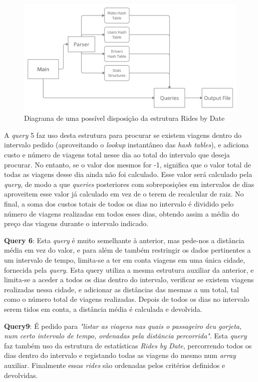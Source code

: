 \documentclass[12pt,a4paper]{report}
\begin{document}
    \begin{figure}[h]
    \includegraphics[scale = 0.45]{diagram2.png}
    \centering
    \caption{Diagrama de uma possível disposição da estrutura Rides by Date}
    \end{figure} 

    \par A \textit{query} 5 faz uso desta estrutura para procurar se existem viagens dentro do intervalo pedido (aproveitando o \textit{lookup} instantâneo das \textit{hash tables}), e adiciona custo e número de viagens total nesse dia ao total do intervalo que deseja procurar. No entanto, se o valor dos mesmos for -1, significa que o valor total de todas as viagens desse dia ainda não foi calculado. Esse valor será calculado pela \textit{query}, de modo a que \textit{queries} posteriores com sobreposições em intervalos de dias aproveitem esse valor já calculado em vez de o terem de recalcular de raiz. No final, a soma dos custos totais de todos os dias no intervalo é dividido pelo número de viagens realizadas em todos esses dias, obtendo assim a média do preço das viagens durante o intervalo indicado.
    
    \par \textbf{Query 6}: Esta \textit{query} é muito semelhante à anterior, mas pede-nos a distância média em vez do valor, e para além de também restringir os dados pertinentes a um intervalo de tempo, limita-se a ter em conta viagens em uma única cidade, fornecida pela \textit{query}. Esta query utiliza a mesma estrutura auxiliar da anterior, e limita-se a aceder a todos os dias dentro do intervalo, verificar se existem viagens realizadas nessa cidade, e adicionar as distâncias das mesmas a um total, tal como o número total de viagens realizadas. Depois de todos os dias no intervalo serem tidos em conta, a distância média é calculada e devolvida.
    \par \textbf{Query9}: É pedido para \textit{"listar as viagens nas quais o passageiro deu gorjeta, num certo intervalo de tempo, ordenadas pela distância percorrida"}. Esta \textit{query} faz também uso da estrutura de estatísticas \textit{Rides by Date}, percorrendo todos os dias dentro do intervalo e registando todas as viagens do mesmo num \textit{array} auxiliar. Finalmente essas \textit{rides} são ordenadas pelos critérios definidos e devolvidas.
\end{document}
